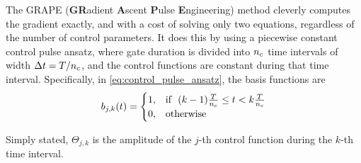 \documentclass[letterpaper]{tufte-handout}
\begin{document}
The GRAPE (\textbf{GR}adient \textbf{A}scent \textbf{P}ulse \textbf{E}ngineering) method\cite[-0.6in]{khaneja_2005} cleverly computes the gradient exactly, and with a cost of solving only two \Schrodinger equations, regardless of the number of control parameters. It does this by using a piecewise constant control pulse ansatz, where gate duration is divided into ${n_c}$ time intervals of width $\Delta t = T/{n_c}$, and the control functions are constant during that time interval. Specifically, in \eqref{eq:control_pulse_ansatz}, the basis functions are
\[
    b_{j,k}(t) = \begin{cases}
     1, & \text{if }\ (k-1)\frac{T}{{n_c}} \leq t  < k\frac{T}{{n_c}} \\
     0, & \text{otherwise}
    \end{cases}
\]
\begin{marginfigure}
    
    \caption{An example of a piecewise constant control function, the kind which the GRAPE method uses.}
\end{marginfigure}
Simply stated, $\Theta_{j,k}$ is the amplitude of the $j$-th control function during the $k$-th time interval.
\end{document}
